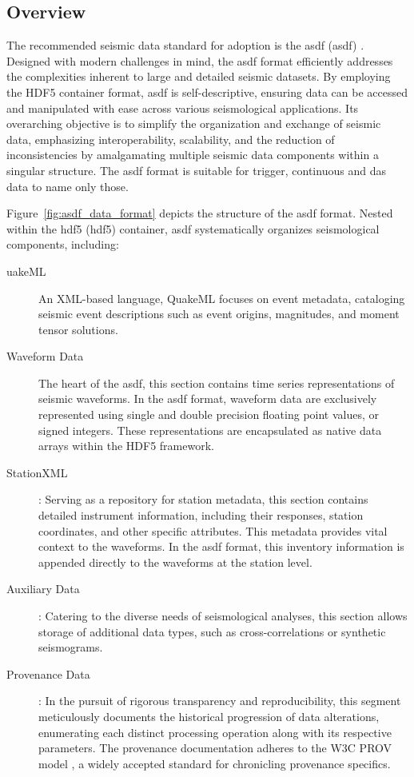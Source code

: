 \subsection{Overview}

The recommended seismic data standard for adoption is the \glsdesc{asdf} (\gls{asdf}) \citep{krischer2016asdf}. Designed with modern challenges in mind, the \gls{asdf} format efficiently addresses the complexities inherent to large and detailed seismic datasets. By employing the HDF5 container format, \gls{asdf} is self-descriptive, ensuring data can be accessed and manipulated with ease across various seismological applications. Its overarching objective is to simplify the organization and exchange of seismic data, emphasizing interoperability, scalability, and the reduction of inconsistencies by amalgamating multiple seismic data components within a singular structure. The \gls{asdf} format is suitable for trigger, continuous and \gls{das} data to name only those.

Figure~\ref{fig:asdf_data_format} depicts the structure of the \gls{asdf} format. Nested within the \glsdesc{hdf5} (\gls{hdf5}) container, \gls{asdf} systematically organizes seismological components, including:

\begin{description}
    \item[uakeML] An XML-based language, QuakeML focuses on event metadata, cataloging seismic event descriptions such as event origins, magnitudes, and moment tensor solutions.
    
    \item[Waveform Data] The heart of the \gls{asdf}, this section contains time series representations of seismic waveforms. In the \gls{asdf} format, waveform data are exclusively represented using single and double precision floating point values, or signed integers. These representations are encapsulated as native data arrays within the HDF5 framework.

    \item[StationXML]: Serving as a repository for station metadata, this section contains detailed instrument information, including their responses, station coordinates, and other specific attributes. This metadata provides vital context to the waveforms. In the \gls{asdf} format, this inventory information is appended directly to the waveforms at the station level.
    
    \item[Auxiliary Data]: Catering to the diverse needs of seismological analyses, this section allows storage of additional data types, such as cross-correlations or synthetic seismograms.
    
    \item[Provenance Data]: In the pursuit of rigorous transparency and reproducibility, this segment meticulously documents the historical progression of data alterations, enumerating each distinct processing operation along with its respective parameters. The provenance documentation adheres to the W3C PROV model \citep{w3cprov2013}, a widely accepted standard for chronicling provenance specifics.

\end{description}

